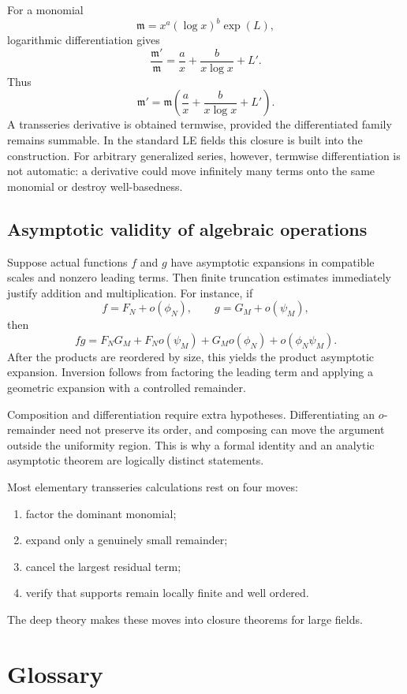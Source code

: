 \documentclass[11pt,openany]{book}
\theoremstyle{plain}
\theoremstyle{definition}
\theoremstyle{remark}
\newcommand{\m}{\mathfrak{m}}
\begin{document}
For a monomial
\[
 \m=x^a(\log x)^b\exp(L),
\]
logarithmic differentiation gives
\[
 \frac{\m'}{\m}
 =\frac{a}{x}+\frac{b}{x\log x}+L'.
\]
Thus
\[
 \m'=\m\left(\frac{a}{x}+\frac{b}{x\log x}+L'\right).
\]
A transseries derivative is obtained termwise, provided the differentiated family remains summable. In the standard LE fields this closure is built into the construction.  For arbitrary generalized series, however, termwise differentiation is not automatic: a derivative could move infinitely many terms onto the same monomial or destroy well-basedness.

\section{Asymptotic validity of algebraic operations}

Suppose actual functions $f$ and $g$ have asymptotic expansions in compatible scales and nonzero leading terms. Then finite truncation estimates immediately justify addition and multiplication. For instance, if
\[
 f=F_N+o(\phi_N),
 \qquad
 g=G_M+o(\psi_M),
\]
then
\[
 fg=F_NG_M+F_No(\psi_M)+G_Mo(\phi_N)+o(\phi_N\psi_M).
\]
After the products are reordered by size, this yields the product asymptotic expansion. Inversion follows from factoring the leading term and applying a geometric expansion with a controlled remainder.

Composition and differentiation require extra hypotheses. Differentiating an $o$-remainder need not preserve its order, and composing can move the argument outside the uniformity region. This is why a formal identity and an analytic asymptotic theorem are logically distinct statements.

\begin{checkpointbox}
Most elementary transseries calculations rest on four moves:
\begin{enumerate}
 \item factor the dominant monomial;
 \item expand only a genuinely small remainder;
 \item cancel the largest residual term;
 \item verify that supports remain locally finite and well ordered.
\end{enumerate}
The deep theory makes these moves into closure theorems for large fields.
\end{checkpointbox}

\chapter{Glossary}
\label{app:glossary}
\end{document}
